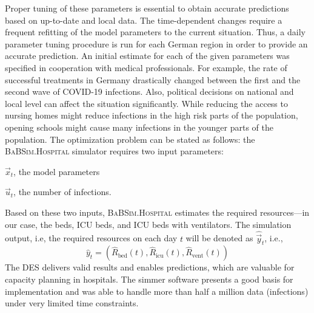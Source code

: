 \documentclass[conference]{IEEEtran}
\newcommand{\babsimhospital}{\textsc{BaBSim.Hospital}\xspace}
\begin{document}
Proper tuning of these parameters is essential to obtain accurate predictions based on up-to-date and local data. 
The time-dependent changes require a frequent refitting of the model parameters to the current situation.
Thus, a daily parameter tuning procedure is run for each German region in order to provide an accurate prediction.
An initial estimate for each of the given parameters was specified in cooperation with medical professionals. 
For example, the rate of successful treatments in Germany drastically changed between the first and the second wave of COVID-19 infections. 
Also, political decisions on national and local level can affect the situation significantly. 
While reducing the access to nursing homes might reduce infections in the high risk parts of the population, opening schools might cause many infections in the younger parts of the population. The optimization problem can be stated as follows:
the \babsimhospital simulator requires two input parameters:
\begin{compactenum}
\item $\vec{x}_t$, the model parameters
\item $\vec{u}_t$, the number of infections.
\end{compactenum}
Based on these two inputs, \babsimhospital estimates the required resources---in our case, the beds, \gls{ICU} beds,  and \gls{ICU} beds with ventilators.
The simulation output, i.e, the required resources on each day $t$ will be denoted as $\hat{\vec{y}}_t$, i.e., 
\begin{equation}\label{eq:haty}
\hat{y}_t = \left( \hat{R}_{\text{bed}}(t),   \hat{R}_{\text{icu}}(t), \hat{R}_{\text{vent}}(t) \right)
\end{equation}
The \gls{DES} delivers valid results and enables predictions, which are valuable for capacity planning in hospitals.
The \gls{simmer} software presents a good basis for implementation and was able to handle more than half a million data (infections) under very limited time constraints. 
\end{document}
